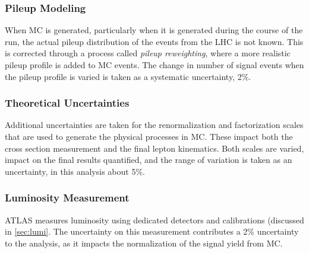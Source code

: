 \subsubsection{Pileup Modeling}
When \ac{MC} is generated, particularly when it is generated during the course of the run, the actual pileup distribution of the events from the \ac{LHC} is not known. This is corrected through a process called \emph{pileup reweighting}, where a more realistic pileup profile is added to \ac{MC} events. The change in number of signal events when the pileup profile is varied is taken as a systematic uncertainty, 2\%.

\subsubsection{Theoretical Uncertainties}

Additional uncertainties are taken for the renormalization and factorization scales that are used to generate the physical processes in \ac{MC}. These impact both the cross section measurement and the final lepton kinematics. Both scales are varied, impact on the final results quantified, and the range of variation is taken as an uncertainty, in this analysis about 5\%. 

\subsubsection{Luminosity Measurement}
\ac{ATLAS} measures luminosity using dedicated detectors and calibrations (discussed in \autoref{sec:lumi}. The uncertainty on this measurement contributes a 2\% uncertainty to the analysis, as it impacts the normalization of the signal yield from \ac{MC}.





